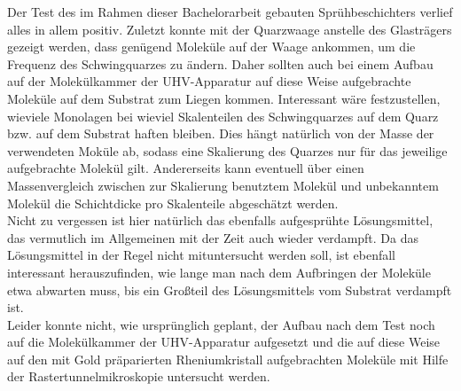 % 
% 
% 
% 
% 



Der Test des im Rahmen dieser Bachelorarbeit gebauten Sprühbeschichters verlief alles in allem
positiv. Zuletzt konnte mit der Quarzwaage anstelle des Glasträgers gezeigt werden, dass genügend
Moleküle auf der Waage ankommen, um die Frequenz des Schwingquarzes zu ändern. Daher sollten auch
bei einem Aufbau auf der Molekülkammer der UHV-Apparatur auf diese Weise aufgebrachte Moleküle auf
dem Substrat zum Liegen kommen. Interessant wäre festzustellen, wieviele Monolagen bei wieviel
Skalenteilen des Schwingquarzes auf dem Quarz bzw. auf dem Substrat haften bleiben. Dies hängt
natürlich von der Masse der verwendeten Moküle ab, sodass eine Skalierung des Quarzes nur für das
jeweilige aufgebrachte Molekül gilt. Andererseits kann eventuell über einen Massenvergleich zwischen
zur Skalierung benutztem Molekül und unbekanntem Molekül die Schichtdicke pro Skalenteile
abgeschätzt werden.\\
Nicht zu vergessen ist hier natürlich das ebenfalls aufgesprühte Lösungsmittel, das vermutlich im
Allgemeinen mit der Zeit auch wieder verdampft. Da das Lösungsmittel in der Regel nicht
mituntersucht werden soll, ist ebenfall interessant herauszufinden, wie lange man nach dem
Aufbringen der Moleküle etwa abwarten muss, bis ein Großteil des Lösungsmittels vom Substrat
verdampft ist.\\

Leider konnte nicht, wie ursprünglich geplant, der Aufbau nach dem Test noch auf die Molekülkammer
der UHV-Apparatur aufgesetzt und die auf diese Weise auf den mit Gold präparierten Rheniumkristall
aufgebrachten Moleküle mit Hilfe der Rastertunnelmikroskopie untersucht werden.

